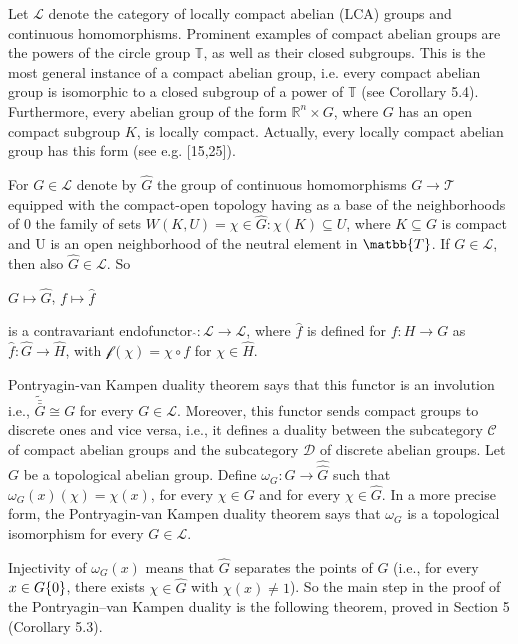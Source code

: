 \documentclass[12pt]{article}
\begin{document}
    
        Let $\mathcal{L}$ denote the category of locally compact abelian (LCA) groups and continuous homomorphisms. Prominent examples
    of compact abelian groups are the powers of the circle group $\mathbb{T}$, as well as their closed subgroups. This is the most general
    instance of a compact abelian group, i.e. every compact abelian group is isomorphic to a closed subgroup of a power of $\mathbb{T}$ (see
    Corollary 5.4). Furthermore, every abelian group of the form    $\mathbb{R}^n \times G$, where $G$ has an open compact subgroup $K$, is locally
    compact. Actually, every locally compact abelian group has this form (see e.g. [15,25]).
    
    
        For $G \in \mathcal{L}$ denote by $\widehat{G}$ the group of continuous homomorphisms $G \to \mathcal{T}$ equipped with the compact-open topology
    having as a base of the neighborhoods of 0 the family of sets $W (K, U) = {\chi \in \widehat{G}: \chi(K) \subseteq U}$, where $K \subseteq G$ is compact and
    U is an open neighborhood of the neutral element in $\matbb{T}$. If $G \in \mathcal{L}$, then also $\widehat{G} \in \mathcal{L}$. So


    $G \mapsto \widehat{G}$, $f \mapsto \widehat{f}$


    is a contravariant endofunctor $\widehat{}:\mathcal{L} \to \mathcal{L}$, where $\widehat{f}$ is defined for $f : H \to G$ as $\widehat{f} : \widehat{G} \to \widehat{H}$, with $\mathcal{f}(\chi) = \chi \circ f$ for $\chi \in \widehat{H}$.
    
    
        Pontryagin-van Kampen duality theorem says that this functor is an involution i.e., $\tilde{\bar{\bar{G}}} \cong G$ for every $G \in \mathcal{L}$. Moreover,
    this functor sends compact groups to discrete ones and vice versa, i.e., it defines a duality between the subcategory $\mathcal{C}$ of
    compact abelian groups and the subcategory $\mathcal{D}$ of discrete abelian groups.
        Let $G$ be a topological abelian group. Define $\omega_G : G \to \widehat{\widehat{G}}$ such that $\omega_G (x)(\chi) = \chi(x)$, for every $\chi \in G$ and for every $\chi \in \widehat{G}$.
    In a more precise form, the Pontryagin-van Kampen duality theorem says that $\omega_G$ is a topological isomorphism for every
    $G \in \mathcal{L}$.


        Injectivity of $\omega_G(x)$ means that $\widehat{G}$ separates the points of $G$ (i.e., for every $x \in G \\ \{0\}$, there exists $\chi \in \widehat{G}$ with $\chi(x) \neq 1$).
    So the main step in the proof of the Pontryagin–van Kampen duality is the following theorem, proved in Section 5 (Corollary 5.3).
\end{document}
